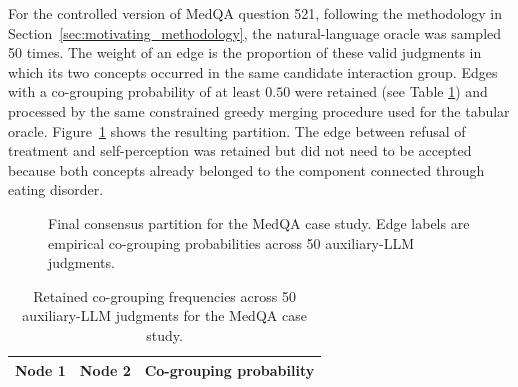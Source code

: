 For the controlled version of MedQA question 521, following the methodology in Section~\ref{sec:motivating_methodology}, the natural-language oracle was
sampled 50 times. The weight of an edge is the proportion of these valid judgments
in which its two concepts occurred in the same candidate interaction group. Edges
with a co-grouping probability of at least $0.50$ were retained (see Table \ref{tab:rq5-cogrouping}) and processed by the
same constrained greedy merging procedure used for the tabular oracle. Figure~\ref{fig:rq5-oracle-grouping}
shows the resulting partition. The edge between refusal of treatment and
self-perception was retained but did not need to be accepted because both concepts
already belonged to the component connected through eating disorder.

\begin{figure}[H]
  \centering
  
  \caption[Case study: final consensus partition for MedQA]{Final consensus partition for the MedQA case study. Edge labels are empirical co-grouping probabilities across 50 auxiliary-LLM judgments.}
  \label{fig:rq5-oracle-grouping}
\end{figure}

\begingroup
\small
\newcommand{\RQFiveNode}[5]{%
  \expandafter\def\csname RQFiveAppendixNodeLabel@#1\endcsname{#2}%
}
\newcommand{\RQFiveEdge}[4]{}

\renewcommand{\RQFiveNode}[5]{}
\renewcommand{\RQFiveEdge}[4]{%
  \csname RQFiveAppendixNodeLabel@#1\endcsname &
  \csname RQFiveAppendixNodeLabel@#2\endcsname & #3\tabularnewline
}
\begin{table}[H]
  \centering
  \caption[Case study: retained co-grouping frequencies for MedQA]{Retained co-grouping frequencies across 50 auxiliary-LLM judgments for the MedQA case study.}
  \label{tab:rq5-cogrouping}
  \begin{tabular}{@{}p{}p{}>{\raggedleft\arraybackslash}p{}@{}}
    \hline
    \textbf{Node 1} & \textbf{Node 2} & \textbf{Co-grouping probability}\\
    \hline
    
  \end{tabular}
\end{table}
\endgroup
